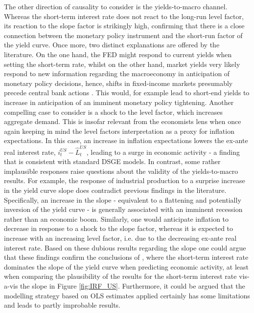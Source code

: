 The other direction of causality to consider is the yields-to-macro channel. 
Whereas the short-term interest rate does not react to the long-run level factor, its reaction to the slope factor is strikingly high, confirming that there is a close connection between the monetary policy instrument and the short-run factor of the yield curve. 
Once more, two distinct explanations are offered by the literature. 
On the one hand, the FED might respond to current yields when setting the short-term rate, whilst on the other hand, market yields very likely respond to new information regarding the macroeconomy in anticipation of monetary policy decisions, hence, shifts in fixed-income markets presumably precede central bank actions \citep{diebold2006macroeconomy, morales2010real}.
This would, for example lead to short-end yields to increase in anticipation of an imminent monetary policy tightening.
Another compelling case to consider is a shock to the level factor, which increases aggregate demand. 
This is insofar relevant from the economists lens when once again keeping in mind the level factors interpretation as a proxy for inflation expectations. 
In this case, an increase in inflation expectations lowers the ex-ante real interest rate, $i^{US}_{t} - \hat{L}^{US}_{t}$, leading to a surge in economic activity - a finding that is consistent with standard DSGE models. 
In contrast, some rather implausible responses raise questions about the validity of the yields-to-macro results. 
For example, the response of industrial production to a surprise increase in the yield curve slope does contradict previous findings in the literature. 
Specifically, an increase in the slope - equivalent to a flattening and potentially inversion of the yield curve - is generally associated with an imminent recession rather than an economic boom. 
Similarly, one would anticipate inflation to decrease in response to a shock to the slope factor, whereas it is expected to increase with an increasing level factor, i.e. due to the decreasing ex-ante real interest rate. 
Based on these dubious results regarding the slope one could argue that these findings confirm the conclusions of \citet{ang2006does}, where the short-term interest rate dominates the slope of the yield curve when predicting economic activity, at least when comparing the plausibility of the results for the short-term interest rate vis-a-vis the slope in Figure \ref{fig:IRF_US}. 
Furthermore, it could be argued that the modelling strategy based on OLS estimates applied certainly has some limitations and leads to partly improbable results. 

